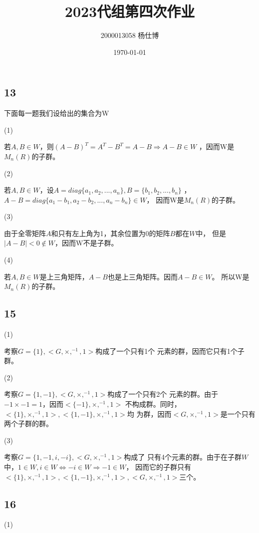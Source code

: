\documentclass[UTF8]{ctexart}
\title{\vspace{-4cm}2023代组第四次作业}
\author{2000013058 杨仕博}
\date{\today}
\begin{document}
\maketitle

\subsection*{13}

下面每一题我们设给出的集合为W

(1)

若$A, B\in W$，则$(A-B)^T = A^T - B^T = A - B\Rightarrow A-B\in W$
，因而W是$M_n(R)$的子群。

(2)

若$A, B\in W$，设$A = diag\{a_1, a_2, ..., a_n\}, B = \{b_1, b_2, ..., b_n\}$
，$A - B = diag\{a_1 - b_1, a_2 - b_2, ..., a_n - b_n\}\in W$，
因而W是$M_n(R)$的子群。

(3)

由于全零矩阵$A$和只有左上角为1，其余位置为0的矩阵$B$都在$W$中，
但是$|A-B|<0\notin W$，因而W不是子群。

(4)

若$A,B\in W$是上三角矩阵，$A-B$也是上三角矩阵。因而$A - B\in W$。
所以W是$M_n(R)$的子群。

\subsection*{15}

(1)

考察$G = \{1\}, <G, \times, ^{-1}, 1>$构成了一个只有1个
元素的群，因而它只有1个子群。

(2)

考察$G = \{1, -1\}, <G, \times, ^{-1}, 1>$构成了一个只有2个
元素的群。由于$-1\times -1 = 1$，因而$<\{-1\}, \times, ^{-1}, 1>$
不构成群。同时，$<\{1\}, \times, ^{-1}, 1>, <\{1, -1\}, \times, ^{-1}, 1>$均
为群，因而$<G, \times, ^{-1}, 1>$是一个只有两个子群的群。

(3)

考察$G = \{1, -1, i, -i\}, <G, \times, ^{-1}, 1>$构成了
只有4个元素的群。由于在子群$W$中，$1\in W, i\in W\Leftrightarrow -i\in W \Rightarrow -1\in W$，
因而它的子群只有$<\{1\}, \times, ^{-1}, 1>, <\{1, -1\}, \times, ^{-1}, 1>, 
<G, \times, ^{-1}, 1>$三个。

\subsection*{16}

(1)
\end{document}
